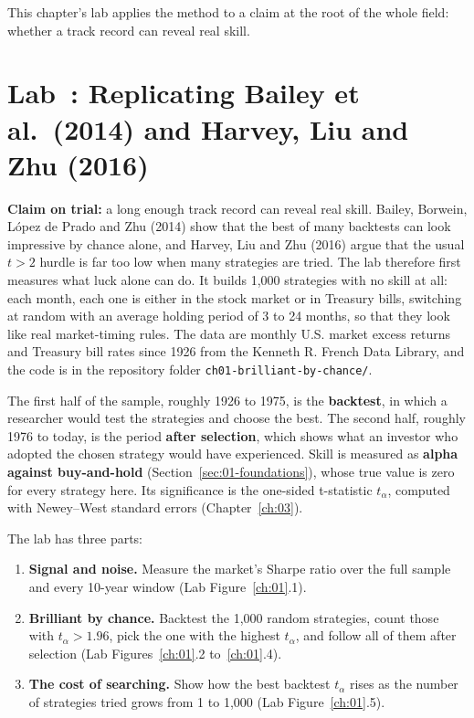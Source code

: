 This chapter's lab applies the method to a claim at the root of the whole field: whether a track record can reveal real skill.

\section{Lab~\thechapter: Replicating Bailey et al.\ (2014) and Harvey, Liu and Zhu (2016)}
\label{sec:01-lab}

\textbf{Claim on trial:} a long enough track record can reveal real skill. Bailey, Borwein, L\'opez de Prado and Zhu (2014) show that the best of many backtests can look impressive by chance alone, and Harvey, Liu and Zhu (2016) argue that the usual $t > 2$ hurdle is far too low when many strategies are tried. The lab therefore first measures what luck alone can do. It builds 1,000 strategies with no skill at all: each month, each one is either in the stock market or in Treasury bills, switching at random with an average holding period of 3 to 24 months, so that they look like real market-timing rules. The data are monthly U.S. market excess returns and Treasury bill rates since 1926 from the Kenneth R. French Data Library, and the code is in the repository folder \texttt{ch01-brilliant-by-chance/}.

The first half of the sample, roughly 1926 to 1975, is the \textbf{backtest}, in which a researcher would test the strategies and choose the best. The second half, roughly 1976 to today, is the period \textbf{after selection}, which shows what an investor who adopted the chosen strategy would have experienced. Skill is measured as \textbf{alpha against buy-and-hold} (Section~\ref{sec:01-foundations}), whose true value is zero for every strategy here. Its significance is the one-sided t-statistic $t_\alpha$, computed with Newey--West standard errors (Chapter~\ref{ch:03}).

The lab has three parts:
\begin{enumerate}
  \item \textbf{Signal and noise.} Measure the market's Sharpe ratio over the full sample and every 10-year window (Lab Figure~\ref{ch:01}.1).
  \item \textbf{Brilliant by chance.} Backtest the 1,000 random strategies, count those with $t_\alpha > 1.96$, pick the one with the highest $t_\alpha$, and follow all of them after selection (Lab Figures~\ref{ch:01}.2 to~\ref{ch:01}.4).
  \item \textbf{The cost of searching.} Show how the best backtest $t_\alpha$ rises as the number of strategies tried grows from 1 to 1,000 (Lab Figure~\ref{ch:01}.5).
\end{enumerate}

